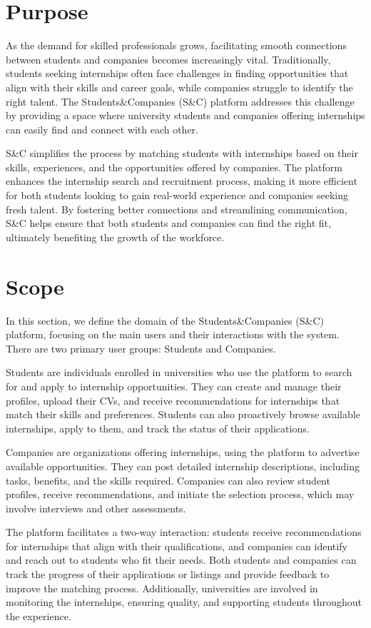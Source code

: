 \section{Purpose}
As the demand for skilled professionals grows, facilitating smooth connections between students and companies becomes increasingly vital. Traditionally, students seeking internships often face challenges in finding opportunities that align with their skills and career goals, while companies struggle to identify the right talent. The Students\&Companies (S\&C) platform addresses this challenge by providing a space where university students and companies offering internships can easily find and connect with each other.

S\&C simplifies the process by matching students with internships based on their skills, experiences, and the opportunities offered by companies. The platform enhances the internship search and recruitment process, making it more efficient for both students looking to gain real-world experience and companies seeking fresh talent. By fostering better connections and streamlining communication, S\&C helps ensure that both students and companies can find the right fit, ultimately benefiting the growth of the workforce.
\section{Scope}
In this section, we define the domain of the Students\&Companies (S\&C) platform, focusing on the main users and their interactions with the system. There are two primary user groups: Students and Companies.

Students are individuals enrolled in universities who use the platform to search for and apply to internship opportunities. They can create and manage their profiles, upload their CVs, and receive recommendations for internships that match their skills and preferences. Students can also proactively browse available internships, apply to them, and track the status of their applications.

Companies are organizations offering internships, using the platform to advertise available opportunities. They can post detailed internship descriptions, including tasks, benefits, and the skills required. Companies can also review student profiles, receive recommendations, and initiate the selection process, which may involve interviews and other assessments.

The platform facilitates a two-way interaction: students receive recommendations for internships that align with their qualifications, and companies can identify and reach out to students who fit their needs. Both students and companies can track the progress of their applications or listings and provide feedback to improve the matching process. Additionally, universities are involved in monitoring the internships, ensuring quality, and supporting students throughout the experience.

